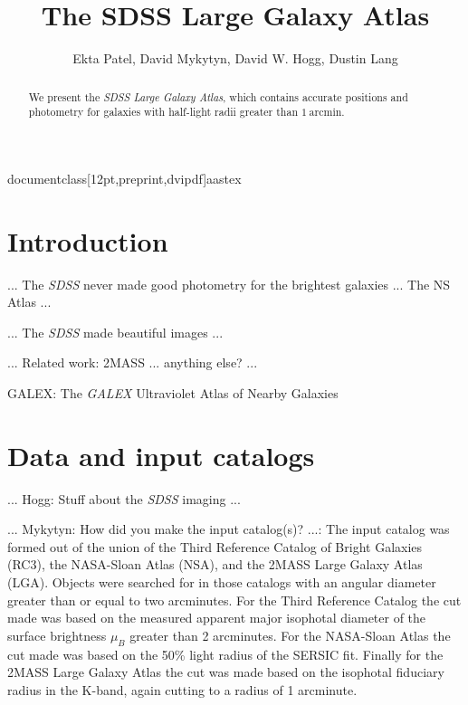 documentclass[12pt,preprint,dvipdf]{aastex}
\newcommand{\project}[1]{\textsl{#1}}
\newcommand{\units}[1]{\mathrm{#1}}
\renewcommand{\mag}{\units{mag}}
\renewcommand{\arcmin}{\units{arcmin}}
\newcommand{\rfifty}{r_{50}}
\newcommand{\rninety}{r_{90}}
\newcommand{\conc}{C}



\title{
       The SDSS Large Galaxy Atlas
      }
\author{
        Ekta Patel\altaffilmark{\ref{CCPP}},
        David Mykytyn\altaffilmark{\ref{CCPP}},
        David W. Hogg\altaffilmark{\ref{CCPP},\ref{MPIA},\ref{email}},
        Dustin Lang\altaffilmark{\ref{CMU}}
       }
\setcounter{address}{1}

\begin{abstract}
We present the \project{SDSS Large Galaxy Atlas}, which contains
accurate positions and photometry for galaxies with half-light radii
greater than $1~\arcmin$.
\end{abstract}

\section{Introduction}

... The \project{SDSS} never made good photometry for the brightest galaxies ... The NS Atlas ...

... The \project{SDSS} made beautiful images ...

... Related work:  2MASS ... anything else? ...

GALEX: The \textit{GALEX} Ultraviolet Atlas of Nearby Galaxies

\section{Data and input catalogs}

... Hogg: Stuff about the \project{SDSS} imaging ...

... Mykytyn: How did you make the input catalog(s)? ...:  The input catalog was formed out of the union of the Third Reference Catalog of Bright Galaxies (RC3), the NASA-Sloan Atlas (NSA), and the 2MASS Large Galaxy Atlas (LGA). Objects were searched for in those catalogs with an angular diameter greater than or equal to two arcminutes. For the Third Reference Catalog the cut made was based on the measured apparent major isophotal diameter of the surface brightness $\mu_{B}$ greater than 2 arcminutes. For the NASA-Sloan Atlas the cut made was based on the 50\% light radius of the SERSIC fit. Finally for the 2MASS Large Galaxy Atlas the cut was made based on the isophotal fiduciary radius in the K-band, again cutting to a radius of 1 arcminute.

